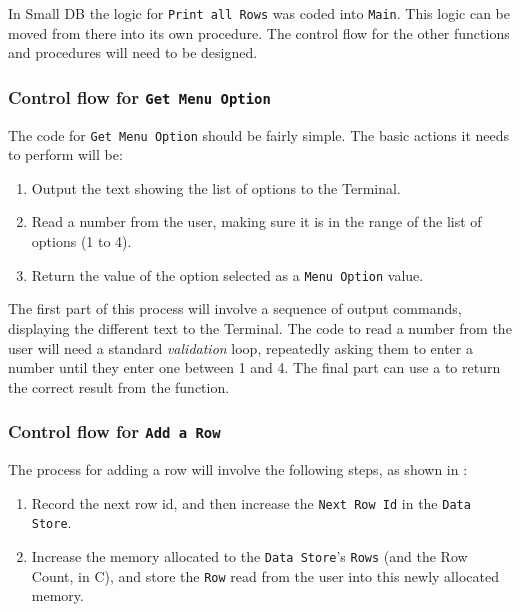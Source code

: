 In Small DB the logic for \texttt{Print all Rows} was coded into \texttt{Main}. This logic can be moved from there into its own procedure. The control flow for the other functions and procedures will need to be designed.


\subsubsection{Control flow for \texttt{Get Menu Option}} %
\label{ssub:control_flow_for_get_menu_option}

The code for \texttt{Get Menu Option} should be fairly simple. The basic actions it needs to perform will be:
\begin{enumerate}
  \item Output the text showing the list of options to the Terminal.
  \item Read a number from the user, making sure it is in the range of the list of options (1 to 4).
  \item Return the value of the option selected as a \texttt{Menu Option} value.
\end{enumerate}

The first part of this process will involve a sequence of output commands, displaying the different text to the Terminal. The code to read a number from the user will need a standard \emph{validation} loop, repeatedly asking them to enter a number until they enter one between 1 and 4. The final part can use a  to return the correct result from the function.


\subsubsection{Control flow for \texttt{Add a Row}} %
\label{ssub:control_flow_for_add a row}

The process for adding a row will involve the following steps, as shown in :
\begin{enumerate}
  \item Record the next row id, and then increase the \texttt{Next Row Id} in the \texttt{Data Store}.
  \item Increase the memory allocated to the \texttt{Data Store}'s \texttt{Rows} (and the Row Count, in C), and store the \texttt{Row} read from the user into this newly allocated memory.
\end{enumerate}

